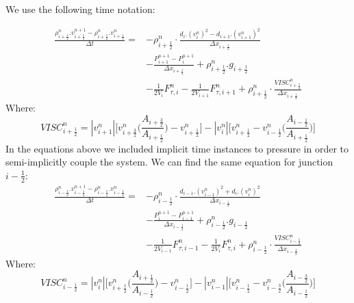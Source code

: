 \documentclass[11pt,letterpaper,titlepage]{article}
\newcommand{\half}{\frac{1}{2}}
\begin{document}
\noindent We use the following time notation:

\begin{equation}
\begin{aligned}
\frac{\rho_{i+\half}^{n}.v_{i+\half}^{n+1}-\rho_{i+\half}^n.v_{i+\half}^n}{\Delta t} =&- \rho_{i+\half}^n\cdot\frac{d_i.(v_{i}^n)^2-d_{i+1}.(v_{i+1}^n)^2}{\Delta x_{i+\half}}     \\
&-\frac{P_{i+1}^{n+1}-P_i^{n+1}}{\Delta x_{i+\half}} +\rho_{i+\half}^n.g_{i+\half} \\
&-\frac{1}{2V_i}F_{\tau,i}^n- \frac{1}{2V_{i+1}}F_{\tau,i+1}^n + \rho_{i+\half}^n\cdot\frac{VISC_{i+\half}^n}{\Delta x_{i+\half}}
\end{aligned}
\end{equation}
\newline
Where:
\begin{equation*}
VISC_{i+\half}^n=|v_{i+1}^n|\biggr[ v_{i+\frac{3}{2}}^n \biggr(\frac{A_{i+\frac{3}{2}}}{A_{i+\half}} \biggr) - v_{i+\half}^n       \biggr] - 
|v_{i}^n|\biggr[ v_{i+\half}^n  - v_{i-\half}^n \biggr(\frac{A_{i-\half}}{A_{i+\half}} \biggr)      \biggr]
\end{equation*}
\newline
\noindent In the equations above we included implicit time instances to pressure in order to semi-implicitly couple the system.
\newline
\newline
We can find the same equation for junction $i-\half$:
\begin{equation}
\begin{aligned}
\frac{\rho_{i-\half}^{n}.v_{i-\half}^{n+1}-\rho_{i-\half}^n.v_{i-\half}^n}{\Delta t} =&- \rho_{i-\half}^n\cdot\frac{d_{i-1}.(v_{i-1}^n)^2+d_{i}.(v_{i}^n)^2}{\Delta x_{i-\half}}     \\
&-\frac{P_{i}^{n+1}-P_{i-1}^{n+1}}{\Delta x_{i-\half}} +\rho_{i-\half}^n.g_{i-\half} \\
&-\frac{1}{2V_{i-1}}F_{\tau,i-1}^n- \frac{1}{2V_{i}}F_{\tau,i}^n
+ \rho_{i-\half}^n\cdot\frac{VISC_{i-\half}^n}{\Delta x_{i-\half}}
\end{aligned}
\end{equation}
\newline
Where:
\begin{equation*}
VISC_{i-\half}^n=|v_{i}^n|\biggr[ v_{i+\frac{1}{2}}^n \biggr(\frac{A_{i+\frac{1}{2}}}{A_{i-\half}} \biggr) - v_{i-\half}^n       \biggr] - 
|v_{i-1}^n|\biggr[ v_{i-\half}^n  - v_{i-\frac{3}{2}}^n \biggr(\frac{A_{i-\frac{3}{2}}}{A_{i-\half}} \biggr)      \biggr]
\end{equation*}
\end{document}
